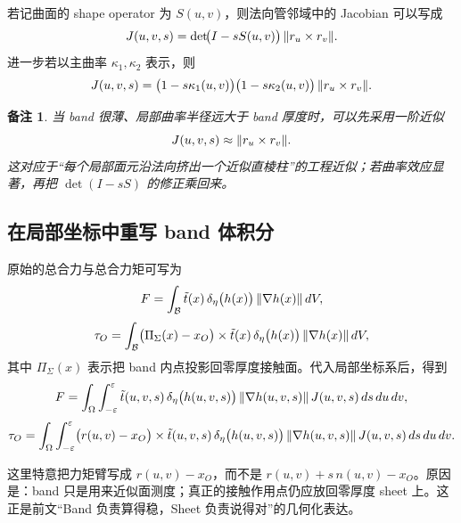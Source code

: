 \documentclass[12pt,a4paper]{ctexart}
\newtheorem{remark}{备注}
\begin{document}
若记曲面的 shape operator 为 $S(u,v)$，则法向管邻域中的 Jacobian 可以写成
\begin{equation}
    J(u,v,s)=\det\!\bigl(I-sS(u,v)\bigr)\,\norm{r_u\times r_v}.
\end{equation}
进一步若以主曲率 $\kappa_1,\kappa_2$ 表示，则
\begin{equation}
    J(u,v,s)=\bigl(1-s\kappa_1(u,v)\bigr)\bigl(1-s\kappa_2(u,v)\bigr)\,\norm{r_u\times r_v}.
\end{equation}

\begin{remark}
当 band 很薄、局部曲率半径远大于 band 厚度时，可以先采用一阶近似
\begin{equation}
    J(u,v,s)\approx \norm{r_u\times r_v}.
\end{equation}
这对应于“每个局部面元沿法向挤出一个近似直棱柱”的工程近似；若曲率效应显著，再把 $\det(I-sS)$ 的修正乘回来。
\end{remark}

\subsection{在局部坐标中重写 band 体积分}

原始的总合力与总合力矩可写为
\begin{equation}
    F=\int_{\mathcal B}\tilde t(x)\,\delta_\eta\bigl(h(x)\bigr)\,\norm{\nabla h(x)}\,dV,
\end{equation}
\begin{equation}
    \tau_O=\int_{\mathcal B}\bigl(\Pi_\Sigma(x)-x_O\bigr)\times \tilde t(x)\,\delta_\eta\bigl(h(x)\bigr)\,\norm{\nabla h(x)}\,dV,
\end{equation}
其中 $\Pi_\Sigma(x)$ 表示把 band 内点投影回零厚度接触面。代入局部坐标系后，得到
\begin{equation}
    F=
    \int_{\Omega}\int_{-\varepsilon}^{\varepsilon}
    \tilde t(u,v,s)\,
    \delta_\eta\bigl(h(u,v,s)\bigr)\,
    \norm{\nabla h(u,v,s)}\,
    J(u,v,s)\,ds\,du\,dv,
\end{equation}
\begin{equation}
    \tau_O=
    \int_{\Omega}\int_{-\varepsilon}^{\varepsilon}
    \bigl(r(u,v)-x_O\bigr)\times
    \tilde t(u,v,s)\,
    \delta_\eta\bigl(h(u,v,s)\bigr)\,
    \norm{\nabla h(u,v,s)}\,
    J(u,v,s)\,ds\,du\,dv.
\end{equation}

这里特意把力矩臂写成 $r(u,v)-x_O$，而不是 $r(u,v)+s\,n(u,v)-x_O$。原因是：band 只是用来近似面测度；真正的接触作用点仍应放回零厚度 sheet 上。这正是前文“Band 负责算得稳，Sheet 负责说得对”的几何化表达。
\end{document}
